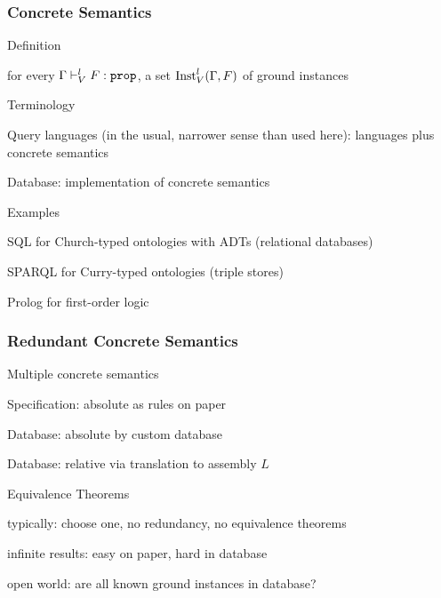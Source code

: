 \begin{frame}\frametitle{Concrete Semantics}
\begin{blockitems}{Definition}
\item for every $\Gamma\vdash^l_V F:\prop$, a set $\mathrm{Inst}^l_V(\Gamma,F)$ of ground instances
\end{blockitems}

\begin{blockitems}{Terminology}
\item Query languages (in the usual, narrower sense than used here): languages plus concrete semantics
\item Database: implementation of concrete semantics
\end{blockitems}

\begin{blockitems}{Examples}
\item SQL for Church-typed ontologies with ADTs (relational databases)
\item SPARQL for Curry-typed ontologies (triple stores)
\item Prolog for first-order logic
\end{blockitems}
\end{frame}

\begin{frame}\frametitle{Redundant Concrete Semantics}
\begin{blockitems}{Multiple concrete semantics}
\item Specification: absolute as rules on paper
\item Database: absolute by custom database
\item Database: relative via translation to assembly $L$
\end{blockitems}

\begin{blockitems}{Equivalence Theorems}
\item typically: choose one, no redundancy, no equivalence theorems
\item infinite results: easy on paper, hard in database
\item open world: are all known ground instances in database?
\end{blockitems}
\end{frame}

